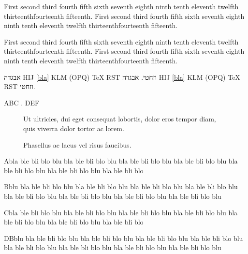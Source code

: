 \documentclass[a4paper]{book}
\begin{document}
{\raggedright First second third fourth fifth sixth seventh eighth
ninth tenth eleventh twelfth thirteenthfourteenth fifteenth. First
second third fourth fifth sixth seventh eighth ninth tenth eleventh
twelfth thirteenthfourteenth fifteenth.\par}

\bigskip

{\raggedleft First second third fourth fifth sixth seventh eighth
ninth tenth eleventh twelfth thirteenthfourteenth fifteenth. First
second third fourth fifth sixth seventh eighth ninth tenth eleventh
twelfth thirteenthfourteenth fifteenth.\par}

\bigskip

\ifx\XeTeXinputencoding\undefined
  \ifx\directlua\undefined
  \else
אבגדה HIJ \ref{bla} KLM \thetable{} (OPQ) \TeX{} RST וזחטי.
  \fi
\else
אבגדה HIJ \ref{bla} KLM \thetable{} (OPQ) \TeX{} RST וזחטי.
\fi

ABC . DEF

\begin{figure}
\centering
{}
\caption{Ut ultricies, dui eget consequat lobortis, dolor eros tempor
diam, quis viverra dolor tortor ac lorem.}
\end{figure}

\begin{figure}
\centering
{}
\caption{Phasellus ac lacus vel risus faucibus.}
\end{figure}



Abla ble bli blo blu bla ble bli blo blu bla ble bli blo blu bla ble
bli blo blu bla ble bli blo blu bla ble bli blo blu bla ble bli blo

Bblu bla ble bli blo blu bla ble bli blo blu bla ble bli blo blu bla
ble bli blo blu bla ble bli blo blu bla ble bli blo blu bla ble bli
blo blu bla ble bli blo blu

Cbla ble bli blo blu bla ble bli blo blu bla ble bli blo blu bla ble
bli blo blu bla ble bli blo blu bla ble bli blo blu bla ble bli blo

DBblu bla ble bli blo blu bla ble bli blo blu bla ble bli blo blu bla
ble bli blo blu bla ble bli blo blu bla ble bli blo blu bla ble bli
blo blu bla ble bli blo blu
\end{document}
